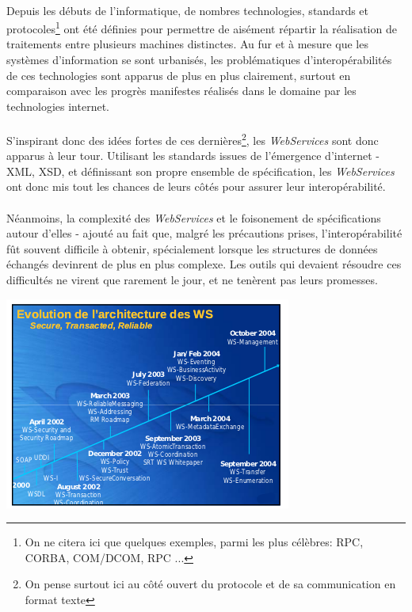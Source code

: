 {  

  \paragraph{} Depuis les débuts de l'informatique, de nombres technologies, standards et
  protocoles\footnote{On ne citera ici que quelques exemples, parmi les plus célèbres: RPC, CORBA,
  COM/DCOM, RPC ...} ont été définies pour permettre de aisément répartir la réalisation de traitements
  entre plusieurs machines distinctes. Au fur et à mesure que les systèmes d'information se sont
  urbanisés, les problématiques d'interopérabilités de ces technologies sont apparus de plus en plus
  clairement, surtout en comparaison avec les progrès manifestes réalisés dans le domaine par les
  technologies internet.

  \paragraph{} S'inspirant donc des idées fortes de ces dernières\footnote{On pense surtout ici au
  côté ouvert du protocole et de sa communication en format texte}, les \textit{WebServices} sont
  donc apparus à leur tour. Utilisant les standards issues de l'émergence d'internet - XML, XSD, et
  définissant son propre ensemble de spécification, les \textit{WebServices} ont donc mis tout les
  chances de leurs côtés pour assurer leur interopérabilité.

  \paragraph{} Néanmoins, la complexité des \textit{WebServices} et le foisonement de spécifications
  autour d'elles - ajouté au fait que, malgré les précautions prises, l'interopérabilité fût souvent
  difficile à obtenir, spécialement lorsque les structures de données échangés devinrent de plus en
  plus complexe. Les outils qui devaient résoudre ces difficultés ne virent que rarement le jour, et
  ne tenèrent pas leurs promesses.

  \begin{center}
    \includegraphics[scale=0.8]{img/ws-star.png}
  \end{center}

}
